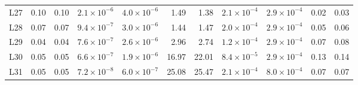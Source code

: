 {\begin{longtable}{@{}lrrrrrrrrrr@{}}
L27 & 0.10 & 0.10 & $2.1{\times}10^{-6}$ & $4.0{\times}10^{-6}$ & 1.49 & 1.38 & $2.1{\times}10^{-4}$ & $2.9{\times}10^{-4}$ & 0.02 & 0.03 \\
L28 & 0.07 & 0.07 & $9.4{\times}10^{-7}$ & $3.0{\times}10^{-6}$ & 1.44 & 1.47 & $2.0{\times}10^{-4}$ & $2.9{\times}10^{-4}$ & 0.05 & 0.06 \\
L29 & 0.04 & 0.04 & $7.6{\times}10^{-7}$ & $2.6{\times}10^{-6}$ & 2.96 & 2.74 & $1.2{\times}10^{-4}$ & $2.9{\times}10^{-4}$ & 0.07 & 0.08 \\
L30 & 0.05 & 0.05 & $6.6{\times}10^{-7}$ & $1.9{\times}10^{-6}$ & 16.97 & 22.01 & $8.4{\times}10^{-5}$ & $2.9{\times}10^{-4}$ & 0.13 & 0.14 \\
L31 & 0.05 & 0.05 & $7.2{\times}10^{-8}$ & $6.0{\times}10^{-7}$ & 25.08 & 25.47 & $2.1{\times}10^{-4}$ & $8.0{\times}10^{-4}$ & 0.07 & 0.07 \\
\end{longtable}}
